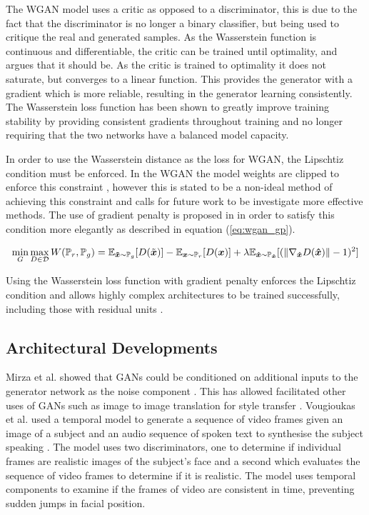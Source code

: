 The WGAN model uses a critic as opposed to a discriminator, this is due to the fact that the discriminator is no longer a binary classifier, but being used to critique the real and generated samples. 
As the Wasserstein function is continuous and differentiable, the critic can be trained until optimality, and \cite{Arjovsky2017} argues that it should be.
As the critic is trained to optimality it does not saturate, but converges to a linear function.
This provides the generator with a gradient which is more reliable, resulting in the generator learning consistently.
The Wasserstein loss function has been shown to greatly improve training stability by providing consistent gradients throughout training and no longer requiring that the two networks have a balanced model capacity.

In order to use the Wasserstein distance as the loss for WGAN, the Lipschtiz condition must be enforced.
In the WGAN the model weights are clipped to enforce this constraint \cite{Arjovsky2017}, however this is stated to be a non-ideal method of achieving this constraint and calls for future work to be investigate more effective methods.
The use of gradient penalty is proposed in \cite{Gulrajani2017} in order to satisfy this condition more elegantly as described in equation (\ref{eq:wgan_gp}).

\begin{equation} \label{eq:wgan_gp}
    \min_{G} \max_{D \in \mathcal{D}} W(\mathbb{P}_{r}, \mathbb{P}_{g}) 
        = \mathbb{E}_{{\boldsymbol{{\tilde{x}}}} \sim \mathbb{P}_{g}} [D(\tilde{{{\boldsymbol{{x}}}}})]
        - \mathbb{E}_{{\boldsymbol{{x}}} \sim \mathbb{P}_{r}} [D({\boldsymbol{{x}}})]
        + \lambda \mathbb{E}_{{\boldsymbol{{\hat{x}}}} \sim \mathbb{P}_{{\boldsymbol{{\hat{x}}}}}} 
            [(\| \nabla_{{\boldsymbol{{\hat{x}}}}} D({\boldsymbol{{\hat{x}}}}) \| - 1)^2]
\end{equation}
\quad

Using the Wasserstein loss function with gradient penalty enforces the Lipschtiz condition and allows highly complex architectures to be trained successfully, including those with residual units \cite{Gulrajani2017}.

\subsection{Architectural Developments}
Mirza et al. showed that GANs could be conditioned on additional inputs to the generator network as the noise component \cite{Mirza2014}.
This has allowed facilitated other uses of GANs such as image to image translation for style transfer \cite{Zhu2017}.
Vougioukas et al. used a temporal model to generate a sequence of video frames given an image of a subject and an audio sequence of spoken text to synthesise the subject speaking \cite{Vougioukas2018}.
The model uses two discriminators, one to determine if individual frames are realistic images of the subject's face and a second which evaluates the sequence of video frames to determine if it is realistic.
The model uses temporal components to examine if the frames of video are consistent in time, preventing sudden jumps in facial position.

